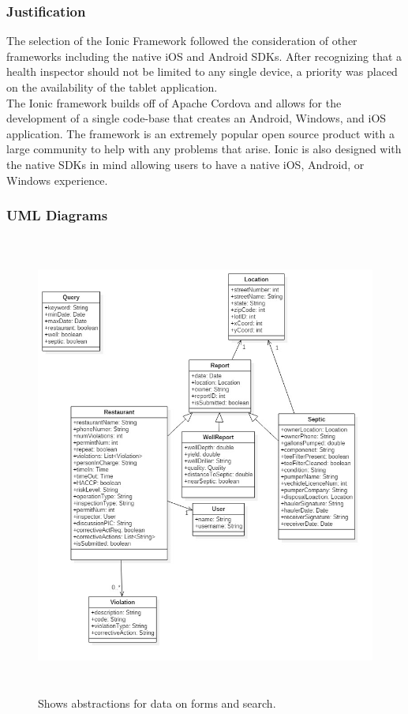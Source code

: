 \documentclass[twoside,letterpaper]{article}
\begin{document}
\subsubsection{Justification}
The selection of the Ionic Framework followed the consideration of other frameworks including the native iOS and Android SDKs. After recognizing that a health inspector should not be limited to any single device, a priority was placed on the availability of the tablet application.
\\
The Ionic framework builds off of Apache Cordova and allows for the development of a single code-base that creates an Android, Windows, and iOS application. The framework is an extremely popular open source product with a large community to help with any problems that arise. Ionic is also designed with the native SDKs in mind allowing users to have a native iOS, Android, or Windows experience.

\subsubsection{UML Diagrams}

\begin{figure}[H]
\centering
\includegraphics[width=6in,height=6in]{uml.jpg}
\caption{Shows abstractions for data on forms and search.}
\end{figure}
\end{document}
